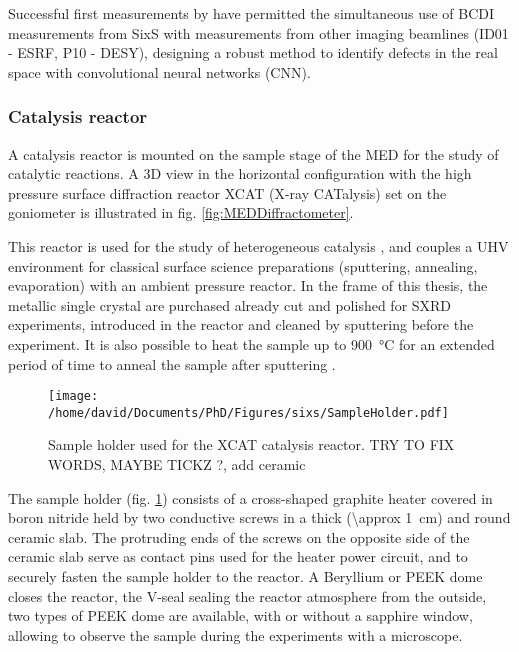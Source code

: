 Successful first measurements by \cite{Lim2021} have permitted the simultaneous use of BCDI measurements from SixS with measurements from other imaging beamlines (ID01 - ESRF, P10 - DESY), designing a robust method to identify defects in the real space with convolutional neural networks (CNN).

\subsubsection{Catalysis reactor}\label{sec:XCAT}

A catalysis reactor is mounted on the sample stage of the MED for the study of catalytic reactions.
A 3D view in the horizontal configuration with the high pressure surface diffraction reactor XCAT (X-ray CATalysis) set on the goniometer is illustrated in fig. \ref{fig:MEDDiffractometer}.

This reactor is used for the study of heterogeneous catalysis \parencite{VanRijn2010, Resta2020a}, and couples a UHV environment for classical surface science preparations (sputtering, annealing, evaporation) with an ambient pressure reactor.
In the frame of this thesis, the metallic single crystal are purchased already cut and polished for SXRD experiments, introduced in the reactor and cleaned by sputtering \parencite{Taglauer1990} before the experiment.
It is also possible to heat the sample up to \qty{900}{\degreeCelsius} for an extended period of time to anneal the sample after sputtering \parencite{Musket1982}.

\begin{figure}[!htb]
    \centering
    \texttt{[image: /home/david/Documents/PhD/Figures/sixs/SampleHolder.pdf]}
    \caption{
        Sample holder used for the XCAT catalysis reactor.
        \textcolor{Important}{TRY TO FIX WORDS, MAYBE TICKZ ?, add ceramic}
    }
    \label{fig:SampleHolder}
\end{figure}

The sample holder (fig. \ref{fig:SampleHolder}) consists of a cross-shaped graphite heater covered in boron nitride held by two conductive screws in a thick (\qty{\approx 1}{\cm}) and round ceramic slab.
The protruding ends of the screws on the opposite side of the ceramic slab serve as contact pins used for the heater power circuit, and to securely fasten the sample holder to the reactor.
A Beryllium or PEEK dome closes the reactor, the V-seal sealing the reactor atmosphere from the outside, two types of PEEK dome are available, with or without a sapphire window, allowing to observe the sample during the experiments with a microscope.

